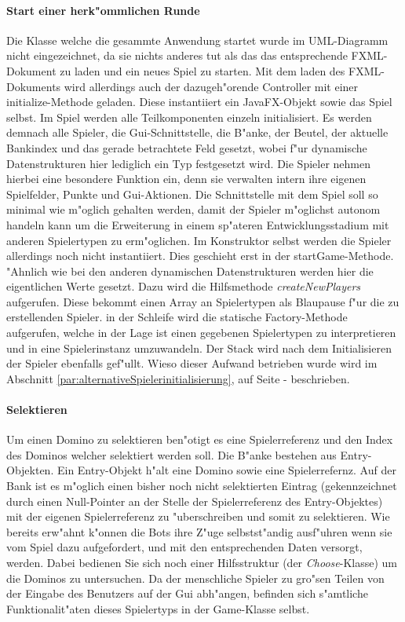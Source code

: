 \paragraph{Start einer herk"ommlichen Runde}
Die Klasse welche die gesammte Anwendung startet wurde im UML-Diagramm nicht eingezeichnet, da sie nichts anderes tut als das das entsprechende FXML-Dokument zu laden und ein neues Spiel zu starten. Mit dem laden des FXML-Dokuments wird allerdings auch der dazugeh"orende Controller mit einer initialize-Methode geladen. Diese instantiiert ein JavaFX-Objekt sowie das Spiel selbst. Im Spiel werden alle Teilkomponenten einzeln initialisiert. Es werden demnach alle Spieler, die Gui-Schnittstelle, die B"anke, der Beutel, der aktuelle Bankindex und das gerade betrachtete Feld gesetzt, wobei f"ur dynamische Datenstrukturen hier lediglich ein Typ festgesetzt wird. Die Spieler nehmen hierbei eine besondere Funktion ein, denn sie verwalten intern ihre eigenen Spielfelder, Punkte und Gui-Aktionen. Die Schnittstelle mit dem Spiel soll so minimal wie m"oglich gehalten werden, damit der Spieler m"oglichst autonom handeln kann um die Erweiterung in einem sp"ateren Entwicklungsstadium mit anderen Spielertypen zu erm"oglichen. Im Konstruktor selbst werden die Spieler allerdings noch nicht instantiiert. Dies geschieht erst in der startGame-Methode. "Ahnlich wie bei den anderen dynamischen Datenstrukturen werden hier die eigentlichen Werte gesetzt. Dazu wird die Hilfsmethode \emph{createNewPlayers} aufgerufen. Diese bekommt einen Array an Spielertypen als \glqq Blaupause\grqq {} f"ur die zu erstellenden Spieler. in der Schleife wird die statische Factory-Methode aufgerufen, welche in der Lage ist einen gegebenen Spielertypen zu interpretieren und in eine Spielerinstanz umzuwandeln. Der Stack wird nach dem Initialisieren der Spieler ebenfalls gef"ullt. Wieso dieser Aufwand betrieben wurde wird im Abschnitt \ref{par:alternativeSpielerinitialisierung}, auf Seite \pageref{par:alternativeSpielerinitialisierung} -  beschrieben. 

\paragraph{Selektieren}
Um einen Domino zu selektieren ben"otigt es eine Spielerreferenz und den Index des Dominos welcher selektiert werden soll. Die B"anke bestehen aus Entry-Objekten. Ein Entry-Objekt h"alt eine Domino sowie eine Spielerrefernz. 
Auf der Bank ist es m"oglich einen bisher noch nicht selektierten Eintrag (gekennzeichnet durch einen Null-Pointer an der Stelle der Spielerreferenz des Entry-Objektes) mit der eigenen Spielerreferenz zu "uberschreiben und somit zu selektieren. Wie bereits erw"ahnt k"onnen die Bots ihre Z"uge selbstst"andig ausf"uhren wenn sie vom Spiel dazu aufgefordert, und mit den entsprechenden Daten versorgt, werden. Dabei bedienen Sie sich noch einer Hilfsstruktur (der \emph{Choose}-Klasse) um die Dominos zu untersuchen. Da der menschliche Spieler zu gro"sen Teilen von der Eingabe des Benutzers auf der Gui abh"angen, befinden sich s"amtliche Funktionalit"aten dieses Spielertyps in der Game-Klasse selbst. 

